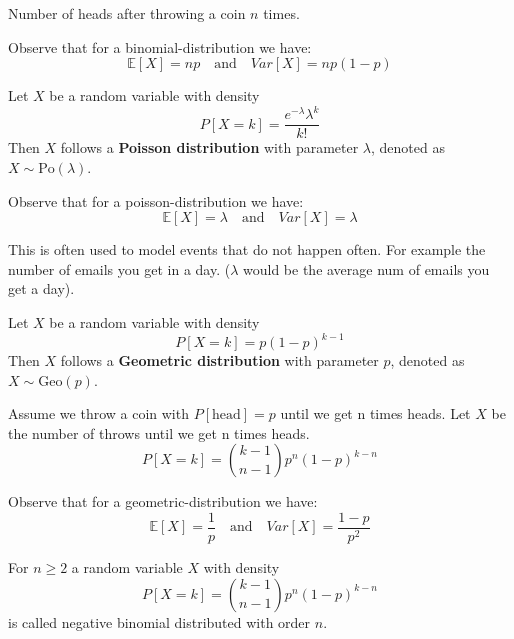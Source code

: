 \begin{example}
    Number of heads after throwing a coin $n$ times.
\end{example}

\begin{remark}
    Observe that for a binomial-distribution we have:
    $$\mathbb{E}[X] = np \quad \text{and} \quad Var[X] = np(1-p)$$
\end{remark}

\begin{definition}
    Let $X$ be a random variable with density
    $$P[X=k] = \frac{e^{-\lambda} \lambda^k}{k!}$$
    Then $X$ follows a \textbf{Poisson distribution} with parameter $\lambda$, denoted as $X \sim \text{Po}(\lambda)$.
\end{definition}

\begin{remark}
    Observe that for a poisson-distribution we have:
    $$\mathbb{E}[X] = \lambda \quad \text{and} \quad Var[X] = \lambda$$
\end{remark}

\begin{remark}
    This is often used to model events that do not happen often. For example the number of emails you get in a day. ($\lambda$ would be the average num of emails you get a day).
\end{remark}

\begin{definition}
    Let $X$ be a random variable with density
    $$P[X=k] = p(1-p)^{k-1}$$
    Then $X$ follows a \textbf{Geometric distribution} with parameter $p$, denoted as $X \sim \text{Geo}(p)$.
\end{definition}

\begin{example}
    Assume we throw a coin with $P[\text{head}] = p$ until we get n times heads. Let $X$ be the number of throws until we get n times heads.
    $$P[X=k] = \binom{k-1}{n-1} p^n (1-p)^{k-n}$$
\end{example}

\begin{remark}
    Observe that for a geometric-distribution we have:
    $$\mathbb{E}[X] = \frac{1}{p} \quad \text{and} \quad Var[X] = \frac{1-p}{p^2}$$
\end{remark}

\begin{definition}
    For $n \geq 2$ a random variable $X$ with density
    $$P[X=k] = \binom{k-1}{n-1} p^n (1-p)^{k-n}$$
    is called negative binomial distributed with order $n$.
\end{definition}

